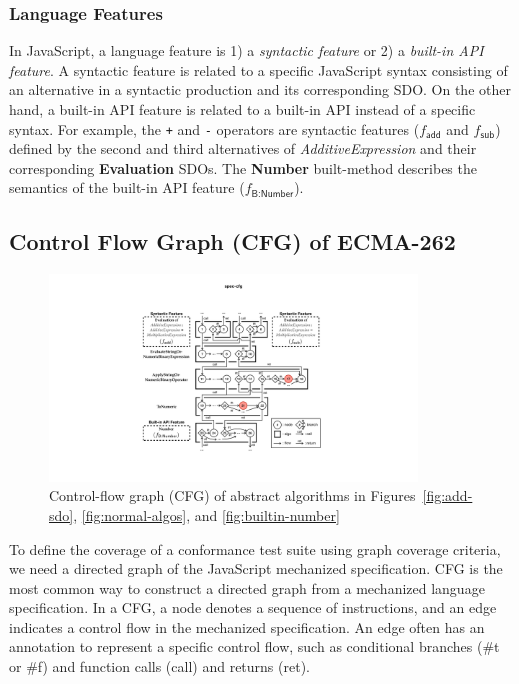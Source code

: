 \documentclass[acmsmall,review,screen]{acmart}
\newcommand{\name}[1]{\textsf{#1}}
\newcommand{\sname}[1]{\name{\small #1}}
\newcommand{\jscode}[1]{\text{\lstinline[style=JS]!#1!}}
\newcommand{\scode}[1]{\texttt{\small{#1}}}
\newcommand{\esnt}[1]{\textit{\color{esnt}#1}}
\newcommand{\feat}{f}
\newcommand{\addfeat}{\feat_{\name{add}}}
\newcommand{\subfeat}{\feat_{\name{sub}}}
\newcommand{\numfeat}{\feat_{\name{B:Number}}}
\begin{document}

\subsubsection{Language Features}\label{sec:feat}

In JavaScript, a language feature is 1) a \textit{syntactic feature} or 2) a
\textit{built-in API feature}.
A syntactic feature is related to a specific JavaScript syntax consisting of an
alternative in a syntactic production and its corresponding SDO.
On the other hand, a built-in API feature is related to a built-in API instead
of a specific syntax.
For example, the \scode{+} and \scode{-} operators are
syntactic features ($\addfeat$ and $\subfeat$) defined by the second and third
alternatives of \esnt{AdditiveExpression} and their corresponding \textbf{Evaluation} SDOs.
The \textbf{Number} built-method describes the semantics of the built-in
\jscode{Number} API feature ($\numfeat$).

\subsection{Control Flow Graph (CFG) of ECMA-262}\label{sec:cfg}

\begin{figure}[t]
  \centering
  \includegraphics[width=0.87\textwidth]{img/spec-cfg}
  \caption{
    Control-flow graph (CFG) of abstract algorithms in
    Figures~\ref{fig:add-sdo}, \ref{fig:normal-algos}, and
    \ref{fig:builtin-number}
  }
  \label{fig:spec-cfg}
\vspace*{-1em}
\end{figure}

To define the coverage of a conformance test suite using graph coverage criteria,
we need a directed graph of the JavaScript mechanized specification.
CFG is the most common way to construct a directed
graph from a mechanized language specification.
In a CFG, a node denotes a sequence of instructions, and an edge
indicates a control flow in the mechanized specification.
An edge often has an annotation to represent a specific control flow,
such as conditional branches (\sname{\#t} or \sname{\#f}) and function calls
(\sname{call}) and returns (\sname{ret}).
\end{document}
